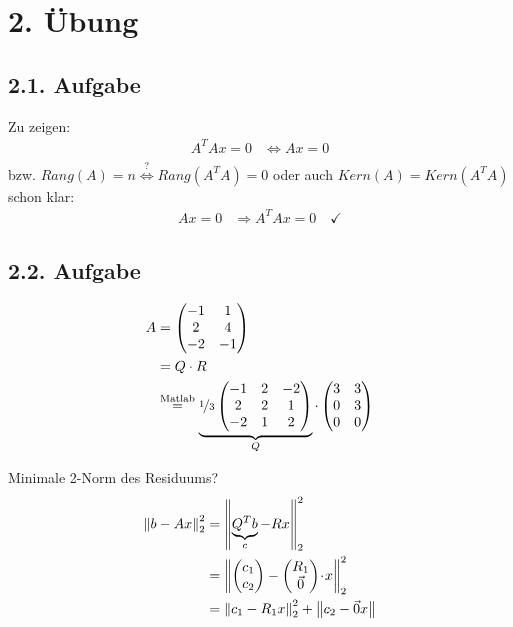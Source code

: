 \section*{2. Übung}
\subsection*{2.1. Aufgabe}
Zu zeigen:
\begin{equation}\begin{split}
	A^TAx = 0 &\Leftrightarrow Ax = 0\\
\end{split}\end{equation}
bzw. $Rang(A) = n \stackrel{?}{\Leftrightarrow} Rang(A^TA) = 0$
oder auch $Kern(A) = Kern(A^TA)$
schon klar:
\begin{equation}\begin{split}
	Ax = 0 &\Rightarrow A^TAx = 0 \quad \checkmark
\end{split}\end{equation}

\subsection*{2.2. Aufgabe}
\begin{equation}\begin{split}
	A &= \begin{pmatrix}
		-1 & 1\\
		2 & 4\\
		-2 & -1
	\end{pmatrix}\\
	&= Q\cdot R\\
	&\stackrel{\text{\lstinline|Matlab|}}{=}
	\underbrace{
		\nicefrac{1}{3}\begin{pmatrix}
		-1&2&-2\\
		2&2&1\\
		-2&1&2
	\end{pmatrix}}_{Q}
	\cdot
	\begin{pmatrix*}
		3&3\\
		0&3\\
		0&0
	\end{pmatrix*}
\end{split}\end{equation}

Minimale 2-Norm des Residuums?
\begin{equation}\begin{split}
	\left\lVert b-Ax\right\rVert_2^2 &= \left\lVert\underbrace{Q^Tb}_{c} -Rx\right\rVert_2^2\\
	&=
	\left\lVert\begin{pmatrix}
			c_1\\
			c_2
		\end{pmatrix}
		-\begin{pmatrix}
			R_1\\
			\vec{0}
		\end{pmatrix}
		\!\cdot\! x
	\right\rVert_2^2 \\
	&= \left\lVert c_1 -R_1x\right\rVert_2^2 + \left\lVert c_2 -\vec{0}x\right\rVert\\
\end{split}\end{equation}

